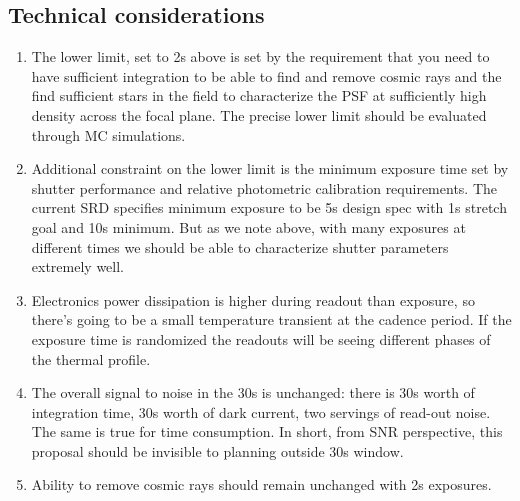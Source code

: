 \documentclass[12pt, a4paper]{article}
\begin{document}
\subsection*{Technical considerations}


\begin{enumerate}


\item The lower limit, set to 2s above is set by the requirement that
  you need to have sufficient integration to be able to find and
  remove cosmic rays and the find sufficient stars in the field to
  characterize the PSF at sufficiently high density across the focal
  plane. The precise lower limit should be evaluated through MC
  simulations.

\item Additional constraint on the lower limit is the minimum exposure
  time set by shutter performance and relative photometric calibration
  requirements. The current SRD specifies minimum exposure to be 5s
  design spec with 1s stretch goal and 10s minimum. But as we note
  above, with many exposures at different times we should be able to
  characterize shutter parameters extremely well.

\item Electronics power dissipation is higher during readout than
  exposure, so there's going to be a small temperature transient at
  the cadence period. If the exposure time is randomized the readouts
  will be seeing different phases of the thermal profile.

\item The overall signal to noise in the 30s is unchanged: there is
  30s worth of integration time, 30s worth of dark current, two
  servings of read-out noise. The same is true for time
  consumption. In short, from SNR perspective, this proposal should be
  invisible to planning outside 30s window.

\item Ability to remove cosmic rays should remain unchanged with 2s exposures.
\end{enumerate}
\end{document}
